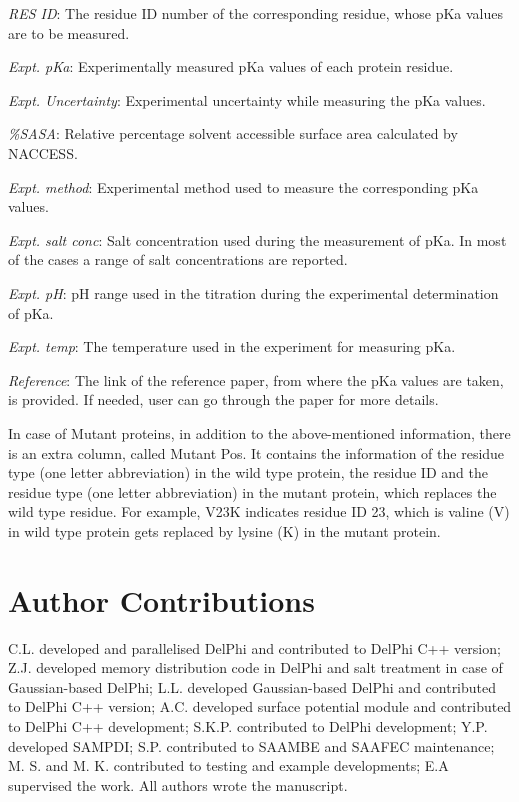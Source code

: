 \documentclass[9pt,tutorial]{livecoms}
\begin{document}
\textit{RES ID}: The residue ID number of the corresponding residue, whose pKa values are to be measured.

\textit{Expt. pKa}: Experimentally measured pKa values of each protein residue.

\textit{Expt. Uncertainty}: Experimental uncertainty while measuring the pKa values.

\textit{\%SASA}: Relative percentage solvent accessible surface area calculated by NACCESS.

\textit{Expt. method}: Experimental method used to measure the corresponding pKa values.

\textit{Expt. salt conc}: Salt concentration used during the measurement of pKa. In most of the cases a range of salt concentrations are reported.

\textit{Expt. pH}: pH range used in the titration during the experimental determination of pKa.

\textit{Expt. temp}: The temperature used in the experiment for measuring pKa.

\textit{Reference}: The link of the reference paper, from where the pKa values are taken, is provided. If needed, user can go through the paper for more details.

In case of Mutant proteins, in addition to the above-mentioned information, there is an extra column, called Mutant Pos. It contains the information of the residue type (one letter abbreviation) in the wild type protein, the residue ID and the residue type (one letter abbreviation) in the mutant protein, which replaces the wild type residue. For example, V23K indicates residue ID 23, which is valine (V) in wild type protein gets replaced by lysine (K) in the mutant protein.


\section{Author Contributions}
%
C.L. developed and parallelised DelPhi and contributed to DelPhi C++ version; Z.J. developed memory distribution code in DelPhi and salt treatment in case of Gaussian-based DelPhi; L.L. developed Gaussian-based DelPhi and contributed to DelPhi C++ version; A.C. developed surface potential module and contributed to DelPhi C++ development;  S.K.P. contributed to DelPhi development; Y.P. developed SAMPDI; S.P.  contributed to SAAMBE and SAAFEC maintenance; M. S. and M. K. contributed to testing and example developments; E.A supervised the work. All authors wrote the manuscript. 
\end{document}
